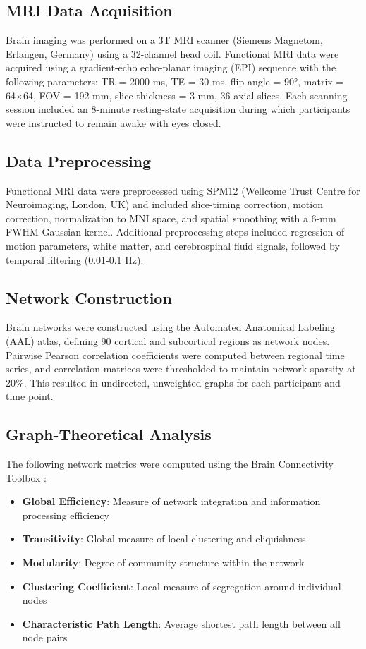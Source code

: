 \documentclass[12pt,a4paper]{article}
\begin{document}
\subsection{MRI Data Acquisition}

Brain imaging was performed on a 3T MRI scanner (Siemens Magnetom, Erlangen, Germany) using a 32-channel head coil. Functional MRI data were acquired using a gradient-echo echo-planar imaging (EPI) sequence with the following parameters: TR = 2000 ms, TE = 30 ms, flip angle = 90°, matrix = 64×64, FOV = 192 mm, slice thickness = 3 mm, 36 axial slices. Each scanning session included an 8-minute resting-state acquisition during which participants were instructed to remain awake with eyes closed.

\subsection{Data Preprocessing}

Functional MRI data were preprocessed using SPM12 (Wellcome Trust Centre for Neuroimaging, London, UK) and included slice-timing correction, motion correction, normalization to MNI space, and spatial smoothing with a 6-mm FWHM Gaussian kernel. Additional preprocessing steps included regression of motion parameters, white matter, and cerebrospinal fluid signals, followed by temporal filtering (0.01-0.1 Hz).

\subsection{Network Construction}

Brain networks were constructed using the Automated Anatomical Labeling (AAL) atlas, defining 90 cortical and subcortical regions as network nodes. Pairwise Pearson correlation coefficients were computed between regional time series, and correlation matrices were thresholded to maintain network sparsity at 20\%. This resulted in undirected, unweighted graphs for each participant and time point.

\subsection{Graph-Theoretical Analysis}

The following network metrics were computed using the Brain Connectivity Toolbox \citep{Rubinov2010}:

\begin{itemize}
    \item \textbf{Global Efficiency}: Measure of network integration and information processing efficiency
    \item \textbf{Transitivity}: Global measure of local clustering and cliquishness
    \item \textbf{Modularity}: Degree of community structure within the network
    \item \textbf{Clustering Coefficient}: Local measure of segregation around individual nodes
    \item \textbf{Characteristic Path Length}: Average shortest path length between all node pairs
\end{itemize}
\end{document}
